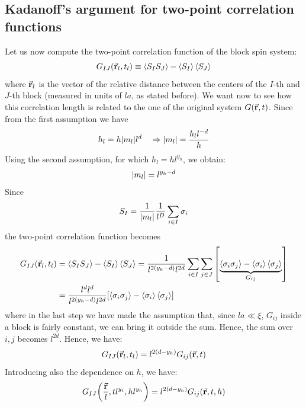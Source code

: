 \documentclass[../main/main.tex]{subfiles}
\begin{document}
\subsection{Kadanoff's argument for two-point correlation functions}
Let us now compute the two-point correlation function of the block spin system:
\begin{equation}
  G_{IJ} (\va{r}_l, t_l) \equiv \expval{S_I S_J} - \expval{S_I}\expval{S_J}
\end{equation}
where \( \va{r}_l \) is the vector of the relative distance between the centers of the \( I \)-th and \( J \)-th block (measured in units of \( la \), as stated before). We want now to see how this correlation length is related to the one of the original system \( G(\va{r},t) \).
Since from the first assumption we have
\begin{equation*}
  h_l = h \abs{m_l} l^d \quad \Rightarrow \abs{m_l} = \frac{h_l l^{-d}}{h}
\end{equation*}
Using the second assumption, for which \( h_l = h l^{y_h} \), we obtain:
\begin{equation*}
  \abs{m_l} = l^{y_h-d}
\end{equation*}
Since
\begin{equation*}
  S_I = \frac{1}{\abs{m_l} } \frac{1}{l^D} \sum_{i \in I}^{} \sigma _i
\end{equation*}
the two-point correlation function becomes
\begin{equation*}
\begin{split}
  G_{IJ} (\va{r}_l, t_l) &=  \expval{S_I S_J} - \expval{S_I} \expval{S_J}
   = \frac{1}{l^{2 (y_h - d)} l^{2d}} \sum_{i \in I}^{} \sum_{j \in J}^{} \qty[ \underbrace{\expval{\sigma _i \sigma _j} - \expval{\sigma _i} \expval{\sigma _j} }_{ G_{ij} }    ] \\
  & = \frac{l^d l^d}{l^{2(y_h-d)}l^{2d}} \qty[ \expval{\sigma _i \sigma _j} - \expval{\sigma _i} \expval{\sigma _j}  ]
\end{split}
\end{equation*}
where in the last step we have made the assumption that, since \( la \ll \xi  \), \( G_{ij} \) inside a block is fairly constant, we can bring it outside the sum. Hence, the sum over \( i,j \) becomes \( l^{2d} \).
Hence, we have:
\begin{equation}
  G_{IJ} (\va{r}_l, t_l) = l^{2(d-y_h)} G_{ij} (\va{r},t)
\end{equation}
Introducing also the dependence on \( h \), we have:
\begin{equation}
  G_{IJ} \qty(\frac{\va{r}}{l}, t l^{y_t}, h l^{y_h}) = l^{2 (d- y_h)} G_{ij} (\va{r},t,h)
 \end{equation}
\end{document}
